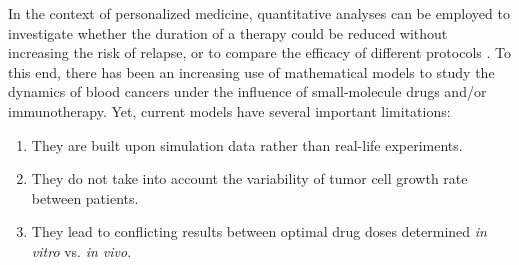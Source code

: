 In the context of personalized medicine, quantitative analyses can be employed to investigate whether the duration of a therapy could be reduced without increasing the risk of relapse, or to compare the efficacy of different protocols \cite{pers-med}.
To this end, there has been an increasing use of mathematical models to study the dynamics of blood cancers under the influence of small-molecule drugs and/or immunotherapy.
Yet, current models have several important limitations: 
\begin{enumerate}
	\item They are built upon simulation data rather than real-life experiments.
	\item They do not take into account the variability of tumor cell growth rate between patients.
	\item They lead to conflicting results between optimal drug doses determined \textit{in vitro} vs. \textit{in vivo}.
\end{enumerate}

